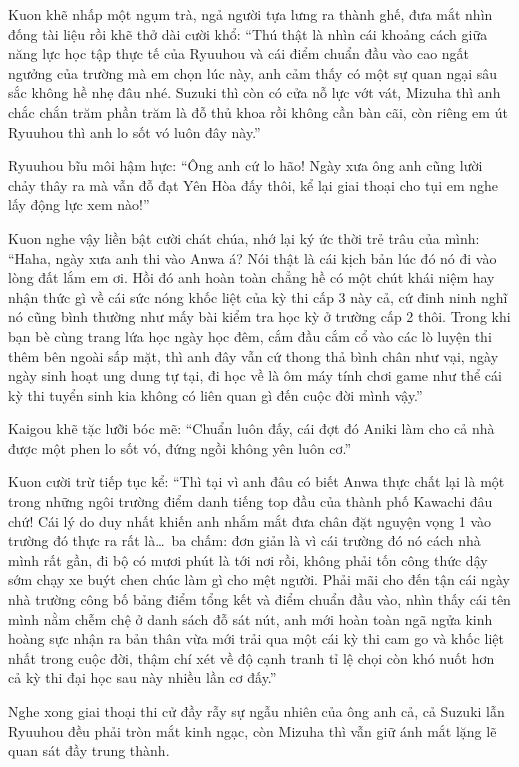 \documentclass[../main.tex]{subfiles}
\begin{document}
Kuon khẽ nhấp một ngụm trà, ngả người tựa lưng ra thành ghế, đưa mắt nhìn đống tài liệu rồi khẽ thở dài cười khổ: ``Thú thật là nhìn cái khoảng cách giữa năng lực học tập thực tế của Ryuuhou và cái điểm chuẩn đầu vào cao ngất ngưởng của trường mà em chọn lúc này, anh cảm thấy có một sự quan ngại sâu sắc không hề nhẹ đâu nhé. Suzuki thì còn có cửa nỗ lực vớt vát, Mizuha thì anh chắc chắn trăm phần trăm là đỗ thủ khoa rồi không cần bàn cãi, còn riêng em út Ryuuhou thì anh lo sốt vó luôn đây này.''

Ryuuhou bĩu môi hậm hực: ``Ông anh cứ lo hão! Ngày xưa ông anh cũng lười chảy thây ra mà vẫn đỗ đạt Yên Hòa đấy thôi, kể lại giai thoại cho tụi em nghe lấy động lực xem nào!''

Kuon nghe vậy liền bật cười chát chúa, nhớ lại ký ức thời trẻ trâu của mình: ``Haha, ngày xưa anh thi vào Anwa á? Nói thật là cái kịch bản lúc đó nó đi vào lòng đất lắm em ơi. Hồi đó anh hoàn toàn chẳng hề có một chút khái niệm hay nhận thức gì về cái sức nóng khốc liệt của kỳ thi cấp 3 này cả, cứ đinh ninh nghĩ nó cũng bình thường như mấy bài kiểm tra học kỳ ở trường cấp 2 thôi. Trong khi bạn bè cùng trang lứa học ngày học đêm, cắm đầu cắm cổ vào các lò luyện thi thêm bên ngoài sấp mặt, thì anh đây vẫn cứ thong thả bình chân như vại, ngày ngày sinh hoạt ung dung tự tại, đi học về là ôm máy tính chơi game như thể cái kỳ thi tuyển sinh kia không có liên quan gì đến cuộc đời mình vậy.''

Kaigou khẽ tặc lưỡi bóc mẽ: ``Chuẩn luôn đấy, cái đợt đó Aniki làm cho cả nhà được một phen lo sốt vó, đứng ngồi không yên luôn cơ.''

Kuon cười trừ tiếp tục kể: ``Thì tại vì anh đâu có biết Anwa thực chất lại là một trong những ngôi trường điểm danh tiếng top đầu của thành phố Kawachi đâu chứ! Cái lý do duy nhất khiến anh nhắm mắt đưa chân đặt nguyện vọng 1 vào trường đó thực ra rất là\dots\ ba chấm: đơn giản là vì cái trường đó nó cách nhà mình rất gần, đi bộ có mươi phút là tới nơi rồi, không phải tốn công thức dậy sớm chạy xe buýt chen chúc làm gì cho mệt người. Phải mãi cho đến tận cái ngày nhà trường công bố bảng điểm tổng kết và điểm chuẩn đầu vào, nhìn thấy cái tên mình nằm chễm chệ ở danh sách đỗ sát nút, anh mới hoàn toàn ngã ngửa kinh hoàng sực nhận ra bản thân vừa mới trải qua một cái kỳ thi cam go và khốc liệt nhất trong cuộc đời, thậm chí xét về độ cạnh tranh tỉ lệ chọi còn khó nuốt hơn cả kỳ thi đại học sau này nhiều lần cơ đấy.''

Nghe xong giai thoại thi cử đầy rẫy sự ngẫu nhiên của ông anh cả, cả Suzuki lẫn Ryuuhou đều phải tròn mắt kinh ngạc, còn Mizuha thì vẫn giữ ánh mắt lặng lẽ quan sát đầy trung thành.
\end{document}
